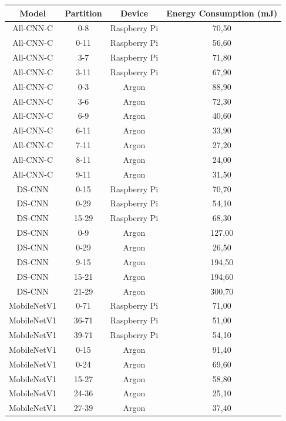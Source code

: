 \begin{table}[H]
    \centering
    \begin{tabular}{|c|c|c|c|}
        \hline
        \textbf{Model} & \textbf{Partition} & \textbf{Device} & \textbf{Energy Consumption (mJ)} \\
        \hline
        All-CNN-C & 0-8 & Raspberry Pi & 70,50 \\
        All-CNN-C & 0-11 & Raspberry Pi & 56,60 \\
        All-CNN-C & 3-7 & Raspberry Pi & 71,80 \\
        All-CNN-C & 3-11 & Raspberry Pi & 67,90 \\
        All-CNN-C & 0-3 & Argon & 88,90 \\
        All-CNN-C & 3-6 & Argon & 72,30 \\
        All-CNN-C & 6-9 & Argon & 40,60 \\
        All-CNN-C & 6-11 & Argon & 33,90 \\
        All-CNN-C & 7-11 & Argon & 27,20 \\
        All-CNN-C & 8-11 & Argon & 24,00 \\
        All-CNN-C & 9-11 & Argon & 31,50 \\
        DS-CNN & 0-15 & Raspberry Pi & 70,70 \\
        DS-CNN & 0-29 & Raspberry Pi & 54,10 \\
        DS-CNN & 15-29 & Raspberry Pi & 68,30 \\
        DS-CNN & 0-9 & Argon & 127,00 \\
        DS-CNN & 0-29 & Argon & 26,50 \\
        DS-CNN & 9-15 & Argon & 194,50 \\
        DS-CNN & 15-21 & Argon & 194,60 \\
        DS-CNN & 21-29 & Argon & 300,70 \\
        MobileNetV1 & 0-71 & Raspberry Pi & 71,00 \\
        MobileNetV1 & 36-71 & Raspberry Pi & 51,00 \\
        MobileNetV1 & 39-71 & Raspberry Pi & 54,10 \\
        MobileNetV1 & 0-15 & Argon & 91,40 \\
        MobileNetV1 & 0-24 & Argon & 69,60 \\
        MobileNetV1 & 15-27 & Argon & 58,80 \\
        MobileNetV1 & 24-36 & Argon & 25,10 \\
        MobileNetV1 & 27-39 & Argon & 37,40 \\

\end{tabular}
\end{table}
